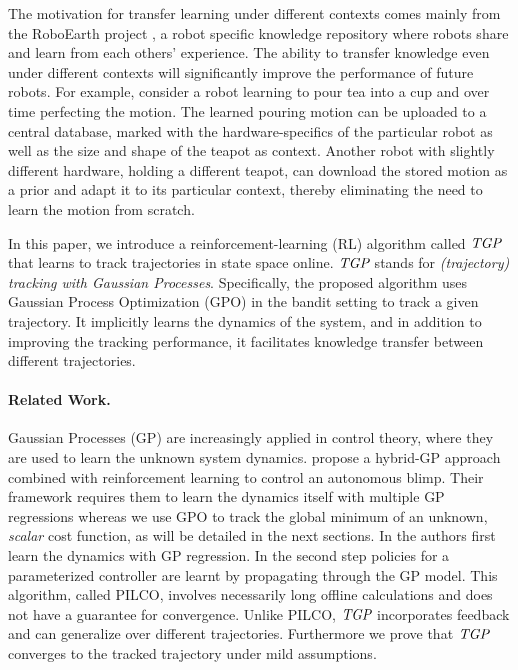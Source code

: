 The motivation for transfer learning under different contexts comes mainly from the RoboEarth project \cite{Waibel11}, a robot specific knowledge repository where robots share and learn from each others' experience.  The ability to transfer knowledge even under different contexts will significantly improve the performance of future robots. %
% 
For example, consider a robot learning to pour tea into a cup and over time perfecting the motion. The learned pouring motion can be uploaded to a central database, marked with the hardware-specifics of the particular robot as well as the size and shape of the teapot as context. Another robot with slightly different hardware, holding a different teapot, can download the stored motion as a prior and adapt it to its particular context, thereby eliminating the need to learn the motion from scratch.

In this paper, we introduce a reinforcement-learning (RL) algorithm called $\emph{TGP}$ that learns to track trajectories in state space online. $\emph{TGP}$ stands for \emph{(trajectory) tracking with Gaussian Processes}. Specifically, the proposed algorithm uses Gaussian Process Optimization (GPO) in the bandit setting to track a given trajectory. It implicitly learns the dynamics of the system, and in addition to improving the tracking performance, it facilitates knowledge transfer between different trajectories. 


\paragraph*{Related Work.}Gaussian Processes (GP) are increasingly applied in control theory, where they are used to learn the unknown system dynamics.  \citet{Ko07} propose a hybrid-GP approach combined with reinforcement learning to control an autonomous blimp. Their framework requires them to learn the dynamics itself with multiple GP regressions whereas we use GPO to track the global minimum of an unknown, \emph{scalar} cost function, as will be detailed in the next sections. In \cite{Deisenroth11a,Deisenroth11b} the authors first learn the dynamics with GP regression. In the second step policies for a parameterized controller are learnt by propagating through the GP model. This algorithm, called PILCO, involves necessarily long offline calculations and does not have a guarantee for convergence. Unlike PILCO, $\emph{TGP}$ incorporates feedback and can generalize over different trajectories. Furthermore we prove that $\emph{TGP}$ converges to the tracked trajectory under mild assumptions.

